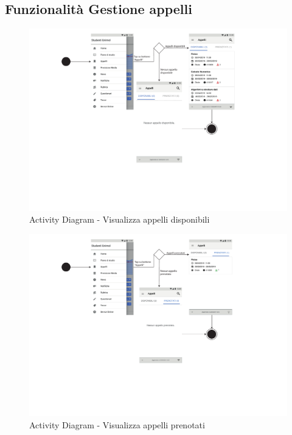 \subsection{Funzionalità Gestione appelli}
\clearpage
\begin{figure}
	\centering
	\includegraphics[width=6in]{imgs/gruppo1/activity_diagrams/AD6_visualizza_appelli_disponibili.pdf}
	\caption{Activity Diagram - Visualizza appelli disponibili}
	\label{diag:visualizzaAppelliDisponibiliAD}
\end{figure}
\newpage

\begin{figure}
	\centering
	\includegraphics[width=6in]{imgs/gruppo1/activity_diagrams/AD7_visualizza_appelli_prenotati.pdf}
	\caption{Activity Diagram - Visualizza appelli prenotati}
	\label{diag:visualizzaAppelliPrenotatiAD}
\end{figure}
\newpage

